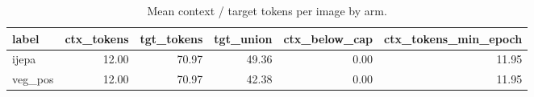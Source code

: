 \begin{table}[t]
\centering
\small
\caption{Mean context / target tokens per image by arm.}
\label{tab:token_budget}
\begin{tabular}{lrrrrr}
\toprule
label & ctx\_tokens & tgt\_tokens & tgt\_union & ctx\_below\_cap & ctx\_tokens\_min\_epoch \\
\midrule
ijepa & 12.00 & 70.97 & 49.36 & 0.00 & 11.95 \\
veg\_pos & 12.00 & 70.97 & 42.38 & 0.00 & 11.95 \\
\bottomrule
\end{tabular}
\end{table}

